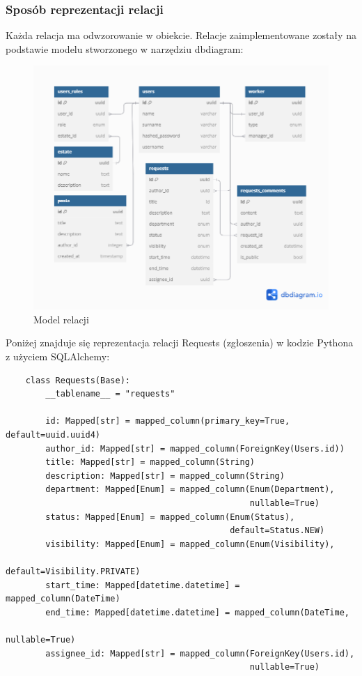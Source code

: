 \subsubsection{Sposób reprezentacji relacji}
Każda relacja ma odwzorowanie w obiekcie. Relacje zaimplementowane zostały na podstawie modelu stworzonego w narzędziu dbdiagram:
\begin{figure}[H]
    \centering
    \includegraphics[width=1\linewidth]{img/ER_model.png}
    \caption{Model relacji}
    \label{fig:data model}
\end{figure}
Poniżej znajduje się reprezentacja relacji Requests (zgłoszenia) w kodzie Pythona z użyciem SQLAlchemy:
\begin{verbatim}
    class Requests(Base):
        __tablename__ = "requests"

        id: Mapped[str] = mapped_column(primary_key=True, default=uuid.uuid4)
        author_id: Mapped[str] = mapped_column(ForeignKey(Users.id))
        title: Mapped[str] = mapped_column(String)
        description: Mapped[str] = mapped_column(String)
        department: Mapped[Enum] = mapped_column(Enum(Department),
                                                 nullable=True)
        status: Mapped[Enum] = mapped_column(Enum(Status), 
                                             default=Status.NEW)
        visibility: Mapped[Enum] = mapped_column(Enum(Visibility), 
                                                 default=Visibility.PRIVATE)
        start_time: Mapped[datetime.datetime] = mapped_column(DateTime)
        end_time: Mapped[datetime.datetime] = mapped_column(DateTime, 
                                                            nullable=True)
        assignee_id: Mapped[str] = mapped_column(ForeignKey(Users.id),
                                                 nullable=True)
\end{verbatim}

